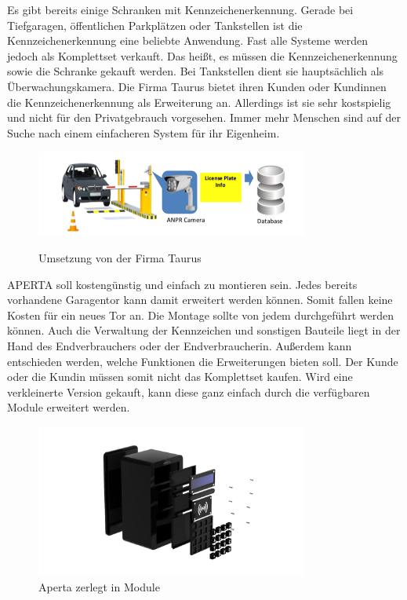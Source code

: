 Es gibt bereits einige Schranken mit Kennzeichenerkennung. Gerade bei Tiefgaragen, öffentlichen Parkplätzen oder Tankstellen ist die Kennzeichenerkennung eine beliebte Anwendung. Fast alle Systeme werden jedoch als Komplettset verkauft. Das heißt, es müssen die Kennzeichenerkennung sowie die Schranke gekauft werden. Bei Tankstellen dient sie hauptsächlich als Überwachungskamera.
Die Firma Taurus bietet ihren Kunden oder Kundinnen die Kennzeichenerkennung als Erweiterung an. Allerdings ist sie sehr kostspielig und nicht für den Privatgebrauch vorgesehen. Immer mehr Menschen sind auf der Suche nach einem einfacheren System für ihr Eigenheim.

\begin{figure}[H]
    \centering
    \includegraphics[width=0.8\textwidth]{pics/Taurus_Umsetzung.png}
    \caption{Umsetzung von der Firma Taurus}
    \cite{TaurusUmsetzung}
  \end{figure}

  APERTA soll kostengünstig und einfach zu montieren sein. Jedes bereits vorhandene Garagentor kann damit erweitert werden können. Somit fallen keine Kosten für ein neues Tor an. Die Montage sollte von jedem durchgeführt werden können. Auch die Verwaltung der Kennzeichen und sonstigen Bauteile liegt in der Hand des Endverbrauchers oder der Endverbraucherin. Außerdem kann entschieden werden, welche Funktionen die Erweiterungen bieten soll. Der Kunde oder die Kundin müssen somit nicht das Komplettset kaufen. Wird eine verkleinerte Version gekauft, kann diese ganz einfach durch die verfügbaren Module erweitert werden.

  \begin{figure}[H]
    \centering
    \includegraphics[width=0.8\textwidth]{pics/Modular_Aperta.png}
    \caption{Aperta zerlegt in Module}
  \end{figure}